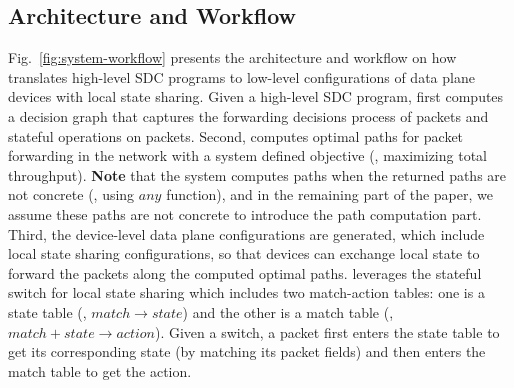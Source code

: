 \vspace{-2mm}
\subsection{Architecture and Workflow}
Fig.~\ref{fig:system-workflow} presents the architecture and workflow on how
\concept{} translates high-level \concept{} SDC programs to low-level
configurations of data plane devices with local state sharing. Given a
high-level \concept{} SDC program, \concept{} first computes a decision graph that captures the forwarding decisions process of
packets and stateful operations on packets. Second, \concept{} computes optimal
paths for packet forwarding in the network with a system defined objective (\eg,
maximizing total throughput). \textbf{Note} that the system computes paths when the returned paths are not concrete (\eg, using $any$ function), and in the remaining part of the paper, we assume these paths are not concrete to introduce the path computation part. Third, the device-level data plane configurations are generated, which
include local state sharing configurations, so that devices can exchange local
state to forward the packets along the computed optimal paths. \concept{} leverages the stateful switch for local state sharing which includes two match-action tables: one is
a state table (\ie, $match \rightarrow state$) and the other is a match table
(\ie, $match+state \rightarrow action$). Given a switch, a
packet first enters the state table to get its corresponding state (by matching
its packet fields) and then enters the match table to get the action.


